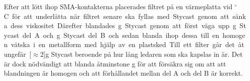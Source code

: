 \documentclass[main.tex]{subfiles}
\begin{document}
Efter att lött ihop SMA-kontakterna placerades filtret på en värmeplatta vid \unit[40]{$^\circ$C} för att underlätta när filtret senare ska fyllas med Stycast genom att sänka dess viskositet. Därefter blandades \unit[12,8]{g} Stycast genom att först väga upp \unit[10]{g} Stycast del A och \unit[2,8]{g} Stycast del B och sedan blanda ihop dessa till en homogen vätska i en metallform med hjälp av en plastsked. 

Till ett filter går det åt ungefär \unit[$\approx 2$]{g} Stycast beroende på hur lång ledaren som ska kapslas in är. Det är dock nödvändigt att blanda åtminstone \unit[10]{g} för att försäkra sig om att att blandningen är homogen och att förhållandet mellan del A och del B är korrekt. 
\end{document}
